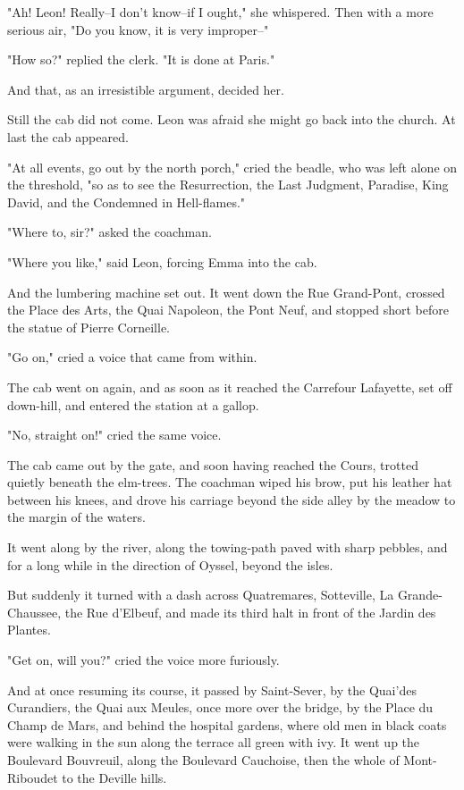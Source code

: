 \documentclass{tufte-book}
\begin{document}
"Ah! Leon! Really--I don't know--if I ought," she whispered. Then with a
more serious air, "Do you know, it is very improper--"

"How so?" replied the clerk. "It is done at Paris."

And that, as an irresistible argument, decided her.

Still the cab did not come. Leon was afraid she might go back into the
church. At last the cab appeared.

"At all events, go out by the north porch," cried the beadle, who was
left alone on the threshold, "so as to see the Resurrection, the Last
Judgment, Paradise, King David, and the Condemned in Hell-flames."

"Where to, sir?" asked the coachman.

"Where you like," said Leon, forcing Emma into the cab.

And the lumbering machine set out. It went down the Rue Grand-Pont,
crossed the Place des Arts, the Quai Napoleon, the Pont Neuf, and
stopped short before the statue of Pierre Corneille.

"Go on," cried a voice that came from within.

The cab went on again, and as soon as it reached the Carrefour
Lafayette, set off down-hill, and entered the station at a gallop.

"No, straight on!" cried the same voice.

The cab came out by the gate, and soon having reached the Cours, trotted
quietly beneath the elm-trees. The coachman wiped his brow, put his
leather hat between his knees, and drove his carriage beyond the side
alley by the meadow to the margin of the waters.

It went along by the river, along the towing-path paved with sharp
pebbles, and for a long while in the direction of Oyssel, beyond the
isles.

But suddenly it turned with a dash across Quatremares, Sotteville, La
Grande-Chaussee, the Rue d'Elbeuf, and made its third halt in front of
the Jardin des Plantes.

"Get on, will you?" cried the voice more furiously.

And at once resuming its course, it passed by Saint-Sever, by the
Quai'des Curandiers, the Quai aux Meules, once more over the bridge, by
the Place du Champ de Mars, and behind the hospital gardens, where old
men in black coats were walking in the sun along the terrace all green
with ivy. It went up the Boulevard Bouvreuil, along the Boulevard
Cauchoise, then the whole of Mont-Riboudet to the Deville hills.
\end{document}
